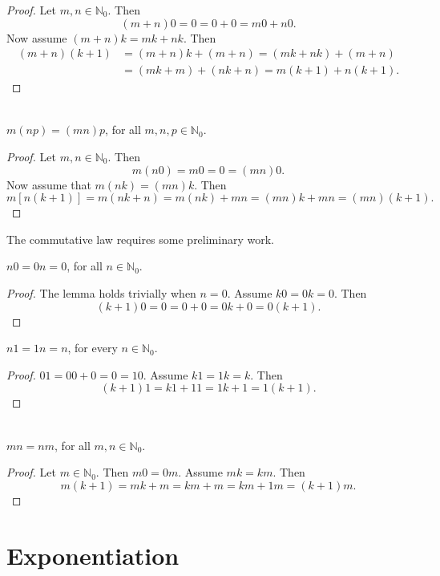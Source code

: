 \begin{proof}
Let $m,n\in \mathbb{N}_0$.  Then
\[
(m+n)0 =0 = 0+0 = m0 + n0.
\]
Now assume $(m+n)k = mk + nk$.
Then
\begin{align*}
(m+n)(k+1)&=(m+n)k+(m+n)= (mk+nk) +(m+n)\\
&=(mk+m)+(nk+n)=m(k+1)+n(k+1).
\end{align*}
\end{proof}

\begin{theorem}{}\\
$m(np) = (mn)p$, for all $m,n,p\in \mathbb{N}_0$.
\end{theorem}

\begin{proof}
Let $m,n\in \mathbb{N}_0$.  Then
\[
m(n0)= m0 = 0 = (mn)0.
\]
Now assume that $m(nk)=(mn)k$.  Then
\[
m[n(k+1)]= m(nk + n)= m(nk) + mn =(mn)k + mn = (mn)(k+1).
\]
\end{proof}

The commutative law requires  some preliminary work.

\begin{lemma}
$n0= 0n=0$, for all $n\in \mathbb{N}_0$.
\end{lemma}

\begin{proof}
The lemma holds trivially when $n=0$.  Assume $k0=
0k=0$.  Then
\[
(k+1)0 =0 = 0+0= 0k+0=0(k+1).
\]
\end{proof}

\begin{lemma}
$n1 =1n=n$, for every $n\in \mathbb{N}_0$.
\end{lemma}
\begin{proof}
$01=00+0=0 =10$.  Assume
$k1=1k=k$.  Then
\[
(k+1)1=k1+11=1k+1=1(k+1).
\]
\end{proof}

\begin{theorem}{}\\
$mn=nm$, for all $m,n\in \mathbb{N}_0$.
\end{theorem}

\begin{proof} Let $m\in \mathbb{N}_0$.
Then $m0=0m$.
Assume $mk=km$. Then
\[
m (k+1) = mk +m = km+m= km +1m=(k+1)m.
\]
\end{proof}

\section{Exponentiation}

